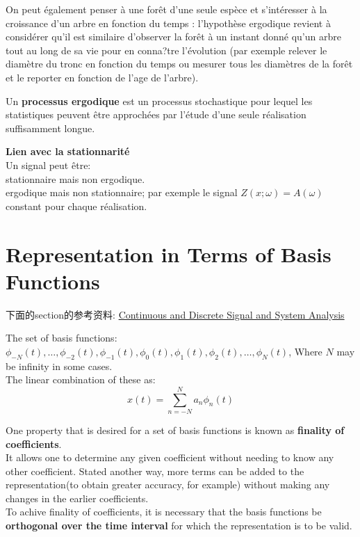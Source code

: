 \documentclass{article}
\begin{document}
On peut également penser à une forêt d'une seule espèce et s'intéresser à la croissance d'un arbre en fonction du temps : l'hypothèse ergodique revient à considérer qu'il est similaire d'observer la forêt à un instant donné qu'un arbre tout au long de sa vie pour en conna?tre l'évolution (par exemple relever le diamètre du tronc en fonction du temps ou mesurer tous les diamètres de la forêt et le reporter en fonction de l'age de l'arbre).

\bigskip
Un \textbf{processus ergodique} est un processus stochastique pour lequel les statistiques peuvent être approchées par l'étude d'une seule réalisation suffisamment longue.

\bigskip
\textbf{Lien avec la stationnarité}\\
Un signal peut être:\\
stationnaire mais non ergodique.\\
ergodique mais non stationnaire; par exemple le signal $Z(x; \omega)=A(\omega)$ constant pour chaque réalisation.

\section{Representation in Terms of Basis Functions}
下面的section的参考资料:
\href{http://www.amazon.com/Continuous-Discrete-Signal-System-Analysis/dp/0030510198}{Continuous and Discrete Signal and System Analysis}

The set of basis functions: $ \phi_{-N}(t), \ldots, \phi_{-2}(t), \phi_{-1}(t), \phi_0(t), \phi_1(t), \phi_2(t), \ldots, \phi_N(t)$, Where $N$ may be infinity in some cases.\\
The linear combination of these as:
\begin{equation}
x(t) = \sum_{n = -N}^N a_n \phi_n(t)
\label{eq.base.combination}
\end{equation}

One property that is desired for a set of basis functions is known as \textbf{finality of coefficients}.\\
It allows one to determine any given coefficient without needing to know any other coefficient. 
Stated another way, more terms can be added to the representation(to obtain greater accuracy, for example) without making any changes in the earlier coefficients.\\
To achive finality of coefficients, it is necessary that the basis functions be \textbf{orthogonal over the time interval} 
for which the representation is to be valid.
\end{document}
